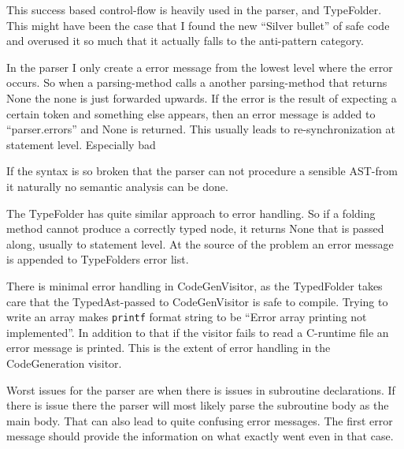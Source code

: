 \documentclass[12pt,a4paper]{article}
\begin{document}
This success based control-flow is heavily used in the parser, and TypeFolder.
This might have been the case that I found the new ``Silver bullet'' of safe code
and overused it so much that it actually falls to the anti-pattern category.

In the parser I only create a error message from the lowest level where the
error occurs.  So when a parsing-method calls a another parsing-method that
returns None the none is just forwarded upwards. If the error is the result
of expecting a certain token and something else appears, then an error message
is added to ``parser.errors'' and None is returned. This usually
leads to re-synchronization at statement level. Especially bad 

If the syntax is so broken that the parser can not procedure a sensible
AST-from it naturally no semantic analysis can be done.

The TypeFolder has quite similar approach to error handling. So if a folding
method cannot produce a correctly typed node, it returns None that is passed along,
usually to statement level. At the source of the problem an error message is
appended to TypeFolders error list.

There is minimal error handling in CodeGenVisitor, as the TypedFolder takes
care that the TypedAst-passed to CodeGenVisitor is safe to compile.  Trying to
write an array makes \texttt{printf} format string to be ``Error array printing
not implemented''. In addition to that if the visitor fails to read a C-runtime
file an error message is printed. This is the extent of error handling in the
CodeGeneration visitor.

Worst issues for the parser are when there is issues in subroutine declarations.
If there is issue there the parser will most likely parse the subroutine
body as the main body. That can also lead to quite confusing error messages.
The first error message should provide the information on what exactly went
even in that case.
\end{document}
